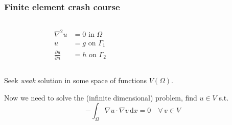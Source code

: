 \documentclass[presentation]{beamer}
\begin{document}
\begin{frame}
  \frametitle{Finite element crash course}
  \begin{columns}
    \begin{column}{0.5\textwidth}
      \begin{align*}
        \nabla^2 u &= 0 \text{ in $\Omega$}\\
        u &= g \text{ on $\Gamma_1$}\\
        \frac{\partial u}{\partial n} &= h \text{ on $\Gamma_2$}
      \end{align*}
    \end{column}
    \begin{column}{0.5\textwidth}
    \end{column}
  \end{columns}

  Seek \emph{weak} solution in some space of functions $V(\Omega)$.

  Now we need to solve the (infinite dimensional) problem, find $u\in V$ s.t.
  \begin{equation*}
    -\int_\Omega \nabla u \cdot \nabla v\, \text{d}x = 0 \quad \forall\, v \in V
  \end{equation*}
\end{frame}
\end{document}

